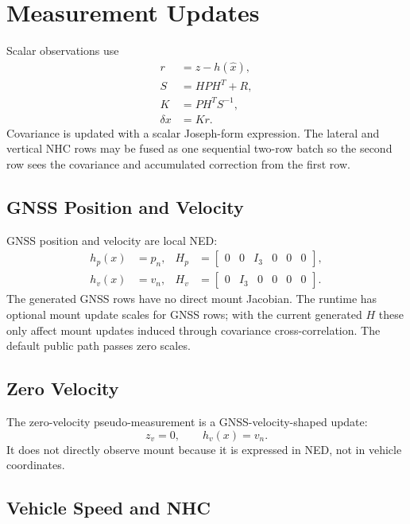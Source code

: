 \documentclass[11pt]{article}
\newcommand{\T}{^{T}}
\begin{document}
\section{Measurement Updates}

Scalar observations use
\begin{align}
  r &= z-h(\hat x),\\
  S &= HPH\T+R,\\
  K &= PH\T S^{-1},\\
  \delta x &= Kr .
\end{align}
Covariance is updated with a scalar Joseph-form expression. The lateral and
vertical NHC rows may be fused as one sequential two-row batch so the second
row sees the covariance and accumulated correction from the first row.

\subsection{GNSS Position and Velocity}

GNSS position and velocity are local NED:
\begin{align}
  h_p(x)&=p_n,& H_p&=\begin{bmatrix}0&0&I_3&0&0&0\end{bmatrix},\\
  h_v(x)&=v_n,& H_v&=\begin{bmatrix}0&I_3&0&0&0&0\end{bmatrix}.
\end{align}
The generated GNSS rows have no direct mount Jacobian. The runtime has
optional mount update scales for GNSS rows; with the current generated \(H\)
these only affect mount updates induced through covariance cross-correlation.
The default public  path passes zero scales.

\subsection{Zero Velocity}

The zero-velocity pseudo-measurement is a GNSS-velocity-shaped update:
\begin{equation}
  z_v=0,\qquad h_v(x)=v_n .
\end{equation}
It does not directly observe mount because it is expressed in NED, not in
vehicle coordinates.

\subsection{Vehicle Speed and NHC}
\end{document}
